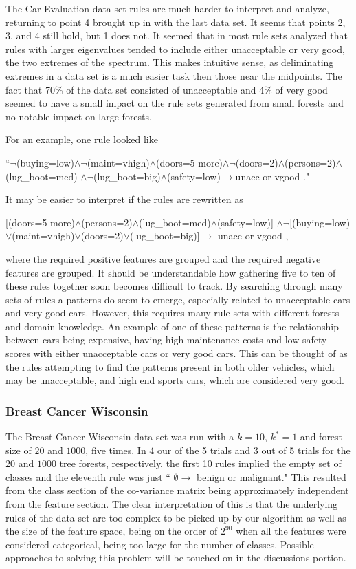 \documentclass[10pt]{article}
\begin{document}
The Car Evaluation data set rules are much harder to interpret and analyze, returning to point 4 brought up in with the last data set. It seems that points 2, 3, and 4 still hold, but 1 does not. It seemed that in most rule sets analyzed that rules with larger eigenvalues tended to include either unacceptable or very good, the two extremes of the spectrum. This makes intuitive sense, as deliminating extremes in a data set is a much easier task then those near the midpoints. The fact that 70\% of the data set consisted of unacceptable and 4\% of very good seemed to have a small impact on the rule sets generated from small forests and no notable impact on large forests. 

For an example, one rule looked like
\begin{center}
``$\neg$(buying=low)$\land \neg$(maint=vhigh)$\land$(doors=5 more)$\land \neg$(doors=2)$\land$(persons=2)$\land$(lug\_boot=med) $\land \neg$(lug\_boot=big)$\land$(safety=low)$\longrightarrow$unacc or vgood  ."
\end{center}
It may be easier to interpret if the rules are rewritten as 
\begin{center}
[(doors=5 more)$\land$(persons=2)$\land$(lug\_boot=med)$\land$(safety=low)] $\land\neg$[(buying=low)$\lor$(maint=vhigh)$\lor$(doors=2)$\lor$(lug\_boot=big)]$\longrightarrow$ unacc or vgood ,
\end{center}
where the required positive features are grouped and the required negative features are grouped. It should be understandable how gathering five to ten of these rules together soon becomes difficult to track. By searching through many sets of rules a patterns do seem to emerge, especially related to unacceptable cars and very good cars. However, this requires many rule sets with different forests and domain knowledge. An example of one of these patterns is the relationship between cars being expensive, having high maintenance costs and low safety scores with either unacceptable cars or very good cars. This can be thought of as the rules attempting to find the patterns present in both older vehicles, which may be unacceptable, and high end sports cars, which are considered very good.

\subsubsection{Breast Cancer Wisconsin}
The Breast Cancer Wisconsin data set was run with a $k=10$, $k^*=1$ and forest size of $20$ and $1000$, five times. In 4 our of the 5 trials and 3 out of 5 trials for the $20$ and $1000$ tree forests, respectively, the first 10 rules implied the empty set of classes and the eleventh rule was just `` $\emptyset \longrightarrow$ benign or malignant." This resulted from the class section of the co-variance matrix being approximately independent from the feature section. The clear interpretation of this is that the underlying rules of the data set are too complex to be picked up by our algorithm as well as the size of the feature space, being on the order of $2^{90}$ when all the features were considered categorical, being too large for the number of classes. Possible approaches to solving this problem will be touched on in the discussions portion.
\end{document}
